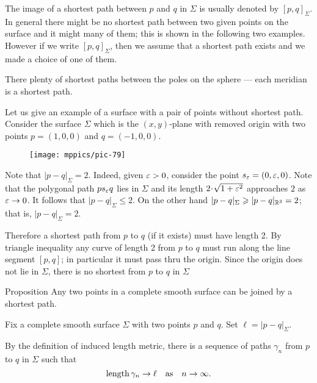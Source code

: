 The image of a shortest path between $p$ and $q$ in $\Sigma$ is usually denoted by $[p,q]_\Sigma$.
In general there might be no shortest path between two given points on the surface
and it might many of them;
this is shown in the following two examples.
However if we write $[p,q]_\Sigma$, then we assume that a shortest path exists and we made a choice of one of them.

 There plenty of shortest paths between the poles on the sphere --- each meridian is a shortest path.


 Let us give an example of a surface with a pair of points without shortest path.
Consider the surface $\Sigma$ which is the $(x,y)$-plane with removed origin with two points $p=(1,0,0)$ and $q=(-1,0,0)$.

\begin{wrapfigure}{r}{28 mm}
\vskip-0mm
\centering
\texttt{[image: mppics/pic-79]}
\vskip-0mm
\end{wrapfigure}

Note that $|p-q|_\Sigma=2$. 
Indeed, given $\eps\z>0$, consider the point $s_\varepsilon=(0,\varepsilon,0)$.
Note that the polygonal path $ps_\varepsilon q$ lies in $\Sigma$ and its length $2\cdot\sqrt{1+\eps^2}$ approaches $2$ as $\varepsilon\to0$.
It follows that $|p-q|_\Sigma\le 2$.
On the other hand $|p-q|_\Sigma\geqslant |p-q|_{\mathbb{R}^3}=2$; that is, $|p-q|_\Sigma= 2$.

Therefore a shortest path from $p$ to $q$ (if it exists) must have length 2.
By triangle inequality any curve of length 2 from $p$ to $q$ must run along the line segment $[p,q]$;
in particular it must pass thru the origin.
Since the origin does not lie in $\Sigma$, there is no shortest from $p$ to $q$ in $\Sigma$ 

\begin{thm}{Proposition}
Any two points in a complete smooth surface can be joined by a shortest path. 
\end{thm}

Fix a complete smooth surface $\Sigma$ with two points $p$ and $q$.
Set $\ell=|p-q|_\Sigma$.

By the definition of induced length metric,
there is a sequence of paths $\gamma_n$ from $p$ to $q$ in $\Sigma$ such that
\[\mathop{\rm length}\nolimits\gamma_n\to \ell\quad\text{as}\quad n\to \infty.\]

